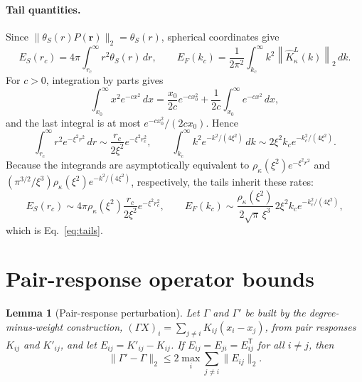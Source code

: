 \documentclass[11pt]{article}
\theoremstyle{plain}
\newtheorem{lemma}[proposition]{Lemma}
\newcommand{\rr}{\bm r}
\newcommand{\PP}{P}
\DeclareRobustCommand{\_}{\textunderscore\allowbreak}
\begin{document}
\paragraph{Tail quantities.}
Since $\|\theta_S(r)\PP(\rr)\|_2=\theta_S(r)$, spherical coordinates give
\begin{equation}
E_S(r_c)
=
4\pi
\int_{r_c}^{\infty}
r^2\theta_S(r)\,dr,
\qquad
E_F(k_c)
=
\frac{1}{2\pi^2}
\int_{k_c}^{\infty}
k^2
\left\|
\widehat K_\kappa^L(k)
\right\|_2\,dk.
\end{equation}
For $c>0$, integration by parts gives
\begin{equation}
\int_{x_0}^{\infty}x^2e^{-cx^2}\,dx
=
\frac{x_0}{2c}e^{-cx_0^2}
+
\frac{1}{2c}\int_{x_0}^{\infty}e^{-cx^2}\,dx,
\end{equation}
and the last integral is at most $e^{-cx_0^2}/(2cx_0)$. Hence
\begin{equation}
\int_{r_c}^{\infty}
r^2e^{-\xi^2r^2}\,dr
\sim
\frac{r_c}{2\xi^2}
e^{-\xi^2r_c^2},
\qquad
\int_{k_c}^{\infty}
k^2e^{-k^2/(4\xi^2)}\,dk
\sim
2\xi^2 k_c
e^{-k_c^2/(4\xi^2)}.
\end{equation}
Because the integrands are asymptotically equivalent to
$\rho_\kappa(\xi^2)e^{-\xi^2r^2}$ and
$(\pi^{3/2}/\xi^3)\rho_\kappa(\xi^2)e^{-k^2/(4\xi^2)}$, respectively, the tails inherit these
rates:
\begin{equation}
E_S(r_c)
\sim
4\pi\rho_\kappa(\xi^2)
\frac{r_c}{2\xi^2}
e^{-\xi^2r_c^2},
\qquad
E_F(k_c)
\sim
\frac{\rho_\kappa(\xi^2)}{2\sqrt{\pi}\,\xi^3}\,
2\xi^2 k_c
e^{-k_c^2/(4\xi^2)},
\end{equation}
which is Eq.~\eqref{eq:tails}.

\section{Pair-response operator bounds}
\label{app:pair-response}

\begin{lemma}[Pair-response perturbation]
\label{lem:pair-response}
Let $\Gamma$ and $\Gamma'$ be built by the degree-minus-weight
construction, $(\Gamma X)_i=\sum_{j\ne i}K_{ij}(x_i-x_j)$, from pair
responses $K_{ij}$ and $K'_{ij}$, and let $E_{ij}=K'_{ij}-K_{ij}$. If
$E_{ij}=E_{ji}=E_{ij}^{\mathsf T}$ for all $i\ne j$, then
\begin{equation}
\|\Gamma'-\Gamma\|_2
\le
2\max_i\sum_{j\ne i}\|E_{ij}\|_2 .
\end{equation}
\end{lemma}
\end{document}
